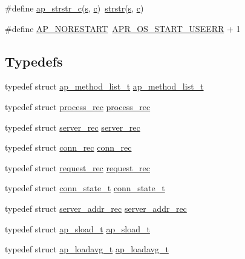 \begin{DoxyCompactItemize}
\item 
\#define \hyperlink{group__APACHE__CORE__DAEMON_ga48f6ba4ea178ad3a334403ec7206d7a3}{ap\+\_\+strstr\+\_\+c}(\hyperlink{pcretest_8txt_a062597889ba244b72877454b1d3adecf}{s},  \hyperlink{pcregrep_8txt_aef720ae5f62fa015619d00171d917416}{c})~\hyperlink{apr__cpystrn_8c_a230063e3f4d6c1324129ea552e026c27}{strstr}(\hyperlink{pcretest_8txt_a062597889ba244b72877454b1d3adecf}{s}, \hyperlink{pcregrep_8txt_aef720ae5f62fa015619d00171d917416}{c})
\item 
\#define \hyperlink{group__APACHE__CORE__DAEMON_ga52d3a802ce651d932f50d0885557e6fb}{A\+P\+\_\+\+N\+O\+R\+E\+S\+T\+A\+RT}~\hyperlink{group__apr__errno_ga803b8badf8695bdfa4fbcf4d330371f0}{A\+P\+R\+\_\+\+O\+S\+\_\+\+S\+T\+A\+R\+T\+\_\+\+U\+S\+E\+E\+RR} + 1
\end{DoxyCompactItemize}
\subsection*{Typedefs}
\begin{DoxyCompactItemize}
\item 
typedef struct \hyperlink{structap__method__list__t}{ap\+\_\+method\+\_\+list\+\_\+t} \hyperlink{group__APACHE__CORE__DAEMON_ga824fa57f315a0d50a7b56498c38939a3}{ap\+\_\+method\+\_\+list\+\_\+t}
\item 
typedef struct \hyperlink{structprocess__rec}{process\+\_\+rec} \hyperlink{group__APACHE__CORE__DAEMON_gac1d3451ddc972f4a6fd73acf7f47d1fb}{process\+\_\+rec}
\item 
typedef struct \hyperlink{structserver__rec}{server\+\_\+rec} \hyperlink{group__APACHE__CORE__DAEMON_ga60fc5abfdd375bb9fd6288cb855972fa}{server\+\_\+rec}
\item 
typedef struct \hyperlink{structconn__rec}{conn\+\_\+rec} \hyperlink{group__APACHE__CORE__DAEMON_ga304420d5069e376de5301b547155ee12}{conn\+\_\+rec}
\item 
typedef struct \hyperlink{structrequest__rec}{request\+\_\+rec} \hyperlink{group__APACHE__CORE__DAEMON_ga3128f4983d5f7a3c4e5d5b258f370ef4}{request\+\_\+rec}
\item 
typedef struct \hyperlink{structconn__state__t}{conn\+\_\+state\+\_\+t} \hyperlink{group__APACHE__CORE__DAEMON_ga0d451c1a417b63673880a52c42bd0ace}{conn\+\_\+state\+\_\+t}
\item 
typedef struct \hyperlink{structserver__addr__rec}{server\+\_\+addr\+\_\+rec} \hyperlink{group__APACHE__CORE__DAEMON_ga9490881dcb192135f2ab47a5113ca651}{server\+\_\+addr\+\_\+rec}
\item 
typedef struct \hyperlink{structap__sload__t}{ap\+\_\+sload\+\_\+t} \hyperlink{group__APACHE__CORE__DAEMON_ga221df691a601284059c96279ede3855e}{ap\+\_\+sload\+\_\+t}
\item 
typedef struct \hyperlink{structap__loadavg__t}{ap\+\_\+loadavg\+\_\+t} \hyperlink{group__APACHE__CORE__DAEMON_ga3be00350e7092a1e1efcc2bd911871fc}{ap\+\_\+loadavg\+\_\+t}
\end{DoxyCompactItemize}
